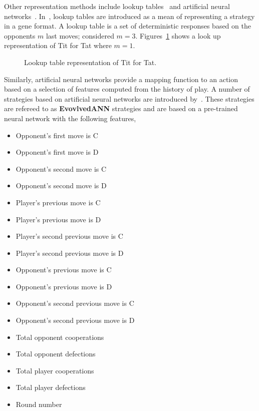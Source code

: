 \documentclass{article}
\begin{document}
Other representation methods include lookup tables~\cite{Axelrod1987, Lindgren1994}
and artificial neural networks~\cite{Fogel1996, Lee2015}. In~\cite{Axelrod1987},
lookup tables are introduced as a mean of representing a strategy in a gene 
format. A lookup table is a set of deterministic responses based on the
opponents \(m\) last moves; \cite{Axelrod1987} considered \(m=3\).
Figures~\ref{fig:tit_for_tat_lu} shows a look up representation of Tit for Tat
where \(m=1\).

\begin{figure}[!hbtp]
    \centering
    
    \caption{Lookup table representation of Tit for Tat.}
    \label{fig:tit_for_tat_lu}
\end{figure}

Similarly, artificial neural networks provide a mapping function to an action
based on a selection of features computed from the history of play. A number 
of strategies based on artificial neural networks are introduced by~\cite{Knight2017}.
These strategies are refereed to as \textbf{EvovlvedANN} strategies and are
based on a pre-trained neural network with the following features,

\begin{multicols}{2}
    \begin{itemize}
        \item Opponent's first move is C
        \item Opponent's first move is D
        \item Opponent's second move is C
        \item Opponent's second move is D
        \item Player's previous move is C
        \item Player's previous move is D
        \item Player's second previous move is C
        \item Player's second previous move is D
        \item Opponent's previous move is C
        \item Opponent's previous move is D
        \item Opponent's second previous move is C
        \item Opponent's second previous move is D
        \item Total opponent cooperations
        \item Total opponent defections
        \item Total player cooperations
        \item Total player defections
        \item Round number
    \end{itemize}
\end{multicols}
\end{document}
